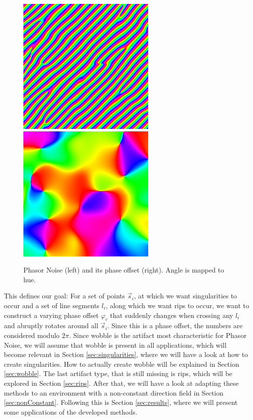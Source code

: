 \documentclass{utue} %
\begin{document}
\begin{figure}[ht]
  \centering
  \includegraphics[width=0.49\linewidth]{images/phasorNoise}
  \includegraphics[width=0.49\linewidth]{images/phasorPhase}
  \caption{Phasor Noise (left) and its phase offset (right). Angle is mapped to hue.}\label{fig:phasorNoisePhase}
\end{figure}

This defines our goal: For a set of points $\vec{s}_i$, at which we want singularities to occur and a set of line segments $l_i$, along which we want rips to occur, we want to construct a varying phase offset $\varphi_c$ that suddenly changes when crossing any $l_i$ and abruptly rotates around all $\vec{s}_i$. Since this is a phase offset, the numbers are considered modulo $2\pi$. Since wobble is the artifact most characteristic for Phasor Noise, we will assume that wobble is present in all applications, which will become relevant in Section \ref{sec:singularities}, where we will have a look at how to create singularities. How to actually create wobble will be explained in Section \ref{sec:wobble}. The last artifact type, that is still missing is rips, which will be explored in Section \ref{sec:rips}. After that, we will have a look at adapting these methods to an environment with a non-constant direction field in Section \ref{sec:nonConstant}. Following this is Section \ref{sec:results}, where we will present some applications of the developed methods.
\end{document}
